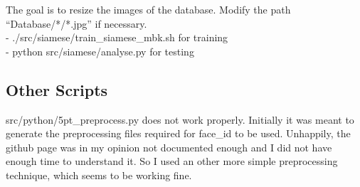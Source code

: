 The goal is to resize the images of the database. Modify the path “Database/*/*.jpg” if necessary.\\

- ./src/siamese/train\_siamese\_mbk.sh for training\\
- python src/siamese/analyse.py for testing


\subsection{Other Scripts}

src/python/5pt\_preprocess.py does not work properly. Initially it was meant to generate the preprocessing files required for face\_id to be used. Unhappily, the github page was in my opinion not documented enough and I did not have enough time to understand it. So I used an other more simple preprocessing technique, which seems to be working fine.